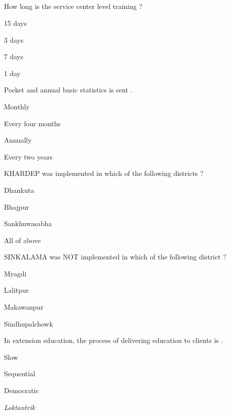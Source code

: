 
\subsection*{}

\begin{questions}

\question How long is the service center level training ?
\begin{items}
\item 15 days
\item 3 days
\item 7 days
\item* 1 day
\end{items}

\question Pocket and annual basic statistics is sent \fillin[][3cm].
\begin{items}
\item Monthly
\item Every four months
\item Annually
\item Every two years
\end{items}

\question KHARDEP was implemented in which of the following districts ?
\begin{items}
\item Dhankuta
\item Bhojpur
\item Sankhuwasabha
\item* All of above
\end{items}

\question SINKALAMA was NOT implemented in which of the following district ?
\begin{items}
\item* Myagdi
\item Lalitpur
\item Makawanpur
\item Sindhupalchowk
\end{items}

\question In extension education, the process of delivering education to clients is \fillin[][3cm].
\begin{items}
\item Slow
\item Sequential
\item* Democratic
\item \textit{Loktantrik}
\end{items}


\end{questions}
